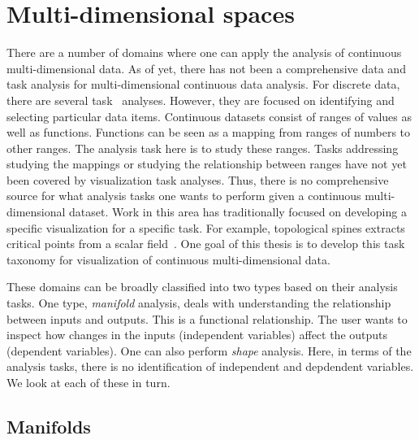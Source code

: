 
\section{Multi-dimensional spaces}
\label{sec:motivation:multi-d}

There are a number of domains where one can apply the analysis of continuous
multi-dimensional data.  As of yet, there has not been a comprehensive data and
task analysis for multi-dimensional continuous data analysis. For discrete
data, there are several task~\cite{task analyses} analyses. However, they are
focused on identifying and selecting particular data items. Continuous datasets
consist of ranges of values as well as functions. Functions can be seen as a
mapping from ranges of numbers to other ranges. The analysis task here is to
study these ranges.  Tasks addressing studying the mappings or studying the
relationship between ranges have not yet been covered by visualization task
analyses. Thus, there is no comprehensive source for what analysis tasks one
wants to perform given a continuous multi-dimensional dataset.  Work in this
area has traditionally focused on developing a specific visualization for a
specific task. For example, topological spines extracts critical points from a
scalar field~\cite{Correa:2011}. One goal of this thesis is to develop this
task taxonomy for visualization of continuous multi-dimensional data.



These domains can be broadly classified into two types based on their analysis
tasks. One type, \emph{manifold} analysis, deals with understanding the
relationship between inputs and outputs. This is a functional relationship.
The user wants to inspect how changes in the inputs (independent variables)
affect the outputs (dependent variables). One can also perform \emph{shape}
analysis. Here, in terms of the analysis tasks, there is no identification of
independent and depdendent variables. We look at each of these in turn.

\subsection{Manifolds}
\label{sec:manifolds}


